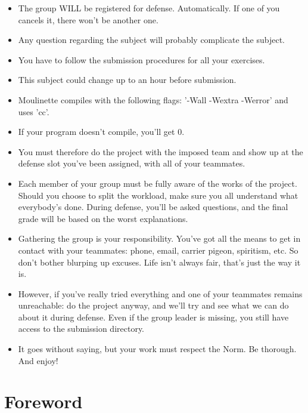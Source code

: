 \documentclass[12pt]{article}
\begin{document}
\begin{itemize}
  \item The group WILL be registered for defense. Automatically. If one of you cancels it, there won't be another one.
  \item Any question regarding the subject will probably complicate the subject.
  \item You have to follow the submission procedures for all your exercises.
  \item This subject could change up to an hour before submission.
  \item Moulinette compiles with the following flags: '-Wall -Wextra -Werror' and uses 'cc'.
  \item If your program doesn't compile, you'll get 0.
  \item You must therefore do the project with the imposed team and show up at the defense slot you've been assigned, with all of your teammates.
  \item Each member of your group must be fully aware of the works of the project. Should you choose to split the workload, make sure you all understand what everybody's done. During defense, you'll be asked questions, and the final grade will be based on the worst explanations.
  \item Gathering the group is your responsibility. You've got all the means to get in contact with your teammates: phone, email, carrier pigeon, spiritism, etc. So don't bother blurping up excuses. Life isn't always fair, that's just the way it is.
  \item However, if you've really tried everything and one of your teammates remains unreachable: do the project anyway, and we'll try and see what we can do about it during defense. Even if the group leader is missing, you still have access to the submission directory.
  \item It goes without saying, but your work must respect the Norm. Be thorough. And enjoy!
\end{itemize}

\newpage

\section{Foreword}
\end{document}

